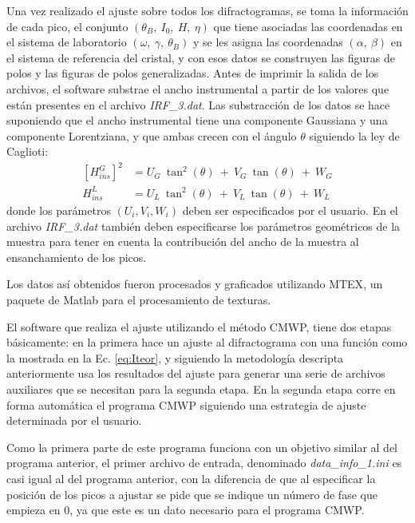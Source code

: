 Una vez realizado el ajuste sobre todos los difractogramas, se toma la información de cada pico, el conjunto $(\theta_B, \ I_0, \ H, \ \eta)$ que tiene asociadas las coordenadas en el sistema de laboratorio $(\omega, \ \gamma, \ \theta_B)$ y se les asigna las coordenadas  $(\alpha, \ \beta)$ en el sistema de referencia del cristal, y con esos datos se construyen las figuras de polos y las figuras de polos generalizadas.
Antes de imprimir la salida de los archivos, el software substrae el ancho instrumental a partir de los valores que están presentes en el archivo \textit{IRF\_3.dat}.
Las substracción de los datos se hace suponiendo que el ancho instrumental tiene una componente Gaussiana y una componente Lorentziana, y que ambas crecen con el ángulo $\theta$ siguiendo la ley de Caglioti\cite{Caglioti1958}:
\begin{align}
  \left[H_{ins}^{G}\right]^2 & =  U_G \ \tan^2(\theta) \ + \ V_G \ \tan(\theta) \ + \ W_G \nonumber \\
  H_{ins}^{L} & =  U_L \ \tan^2(\theta) \ + \ V_L \ \tan(\theta) \ + \ W_L
  \label{eq:caglioti}
\end{align}
\noindent
donde los parámetros $(U_i, V_i, W_i)$ deben ser especificados por el usuario.
En el archivo \textit{IRF\_3.dat} también deben especificarse los parámetros geométricos de la muestra para tener en cuenta la contribución del ancho de la muestra al ensanchamiento de los picos.

Los datos así obtenidos fueron procesados y graficados utilizando MTEX\cite{Hielscher2008}, un paquete de Matlab para el procesamiento de texturas.

El software que realiza el ajuste utilizando el método CMWP, tiene dos etapas básicamente: en la primera hace un ajuste al difractograma con una función como la mostrada en la Ec. \ref{eq:Iteor}, y siguiendo la metodología descripta anteriormente usa los resultados del ajuste para generar una serie de archivos auxiliares que se necesitan para la segunda etapa.
En la segunda etapa corre en forma automática el programa CMWP siguiendo una estrategia de ajuste determinada por el usuario.

Como la primera parte de este programa funciona con un objetivo similar al del programa anterior, el primer archivo de entrada, denominado \textit{data\_info\_1.ini} es casi igual al del programa anterior, con la diferencia de que al especificar la posición de los picos a ajustar se pide que se indique un número de fase que empieza en 0, ya que este es un dato necesario para el programa CMWP.

